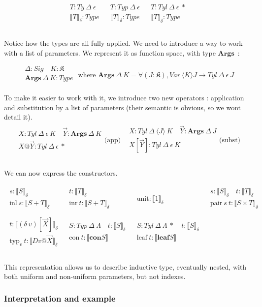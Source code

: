 \documentclass{article}
\newcommand{\vc}[1]{\overrightarrow{#1}}
\newcommand{\lbr}{\llbracket}
\newcommand{\rbr}{\rrbracket}
\newcommand{\sem}[1]{\lbr {#1} \rbr}
\newcommand{\msig}[1]{\langle {#1} \rangle}
\newcommand{\K}{\mathfrak{K}}
\newcommand{\con}{\mathbf{con}}
\newcommand{\args}{\mathbf{Args}}
\newcommand{\lf}{\mathbf{leaf}}
\newcommand{\irule}[2]{\begin{array}{c} {#1} \\\hline {#2}\\ \end{array}}
\begin{document}
\[\begin{array}{ccc}
    \irule{T : Ty\ \Delta\ \epsilon}{\sem{T}_\delta : Type}
    & \irule{T : Typ\ \Delta\ \epsilon}{\sem{T}_\delta : Type}
    & \irule{T : Tyl\ \Delta\ \epsilon\ *}{\sem{T}_\delta : Type}
    \\
\end{array}\]

Notice how the types are all fully applied. We need to introduce a way to work
with a list of parameters. We represent it as function space, with type
$\args$~:

\[\irule{\Delta : Sig\quad K : \K}{\args\ \Delta\ K : Type}
    \text{ where }
    \args\ \Delta\ K = \forall (J : \K), Var\ \msig{K} J\rightarrow Tyl\ \Delta\ \epsilon\ J
\]

To make it easier to work with it, we introduce two new operators : application
and substitution by a list of parameters (their semantic is obvious, so we wont
detail it).
\[\begin{array}{cc}
      \irule{X : Tyl\ \Delta\ \epsilon\ K\quad \vc{Y} : \args\ \Delta\ K}
        {X@\vc{Y} : Tyl\ \Delta\ \epsilon\ *}\text{(app)}
    & \irule{X : Tyl\ \Delta\ \msig{J}\ K\quad \vc{Y} : \args\ \Delta\ J}
        {X[\vc{Y}] : Tyl\ \Delta\ \epsilon\ K}\text{(subst)} \\
\end{array}\]

We can now express the constructors.

\[\begin{array}{cccc}
      \irule{s : \sem{S}_\delta}{\text{inl}\ s : \sem{S + T}_\delta}
    & \irule{t : \sem{T}_\delta}{\text{inr}\ t : \sem{S + T}_\delta}
    & \irule{}{\text{unit} : \sem{1}_\delta}
    & \irule{s : \sem{S}_\delta\quad t : \sem{T}_\delta}{\text{pair}\ s\ t : \sem{S\times T}_\delta}
    \\
      \irule{t : \sem{(\delta\ v)[\vc{X}]}_\delta}{\text{typ}_v\ t : \sem{D v@\vc{X}}_\delta}
    & \irule{S : Typ\ \Delta\ \Lambda\quad t : \sem{S}_\delta}{\text{con}\ t : \sem{\con S}}
    & \irule{S : Tyl\ \Delta\ \Lambda\ *\quad t : \sem{S}_\delta}{\text{leaf}\ t : \sem{\lf S}}
    &
    \\
\end{array}\]

This representation allows us to describe inductive type, eventually nested,
with both uniform and non-uniform parameters, but not indexes.

\subsubsection{Interpretation and example}
\end{document}
